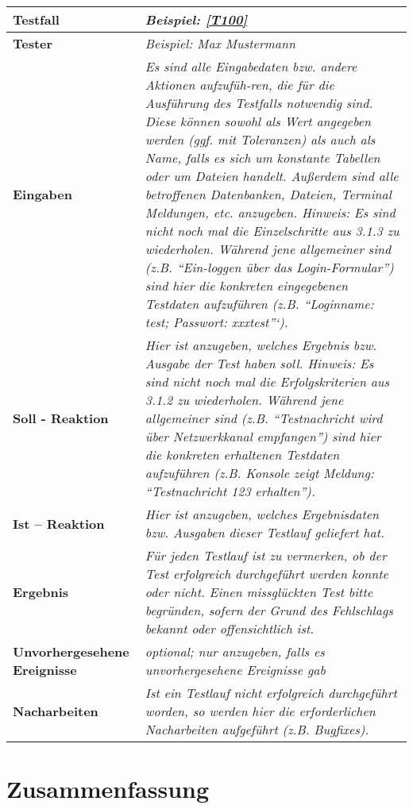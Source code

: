 \begin{longtable}{|p{4cm}|p{11cm}|}
\hline
\textbf{Testfall} & \textit{Beispiel: \ref{T100}} \\
\hline
\textbf{Tester} & \textit{Beispiel: Max Mustermann} \\
\hline
\textbf{Eingaben} & \textit{Es sind alle Eingabedaten bzw. andere Aktionen
aufzufüh-ren, die für die Ausführung des Testfalls notwendig sind.
Diese können sowohl als Wert angegeben werden (ggf. mit Toleranzen) als auch
als Name, falls es sich um konstante Tabellen oder um Dateien handelt. Außerdem
sind alle betroffenen Datenbanken, Dateien, Terminal Meldungen, etc. anzugeben.
Hinweis: Es sind nicht noch mal die Einzelschritte aus 3.1.3 zu wiederholen.
Während jene allgemeiner sind (z.B. "`Ein-loggen über das Login-Formular"')
sind hier die konkreten eingegebenen Testdaten aufzuführen (z.B. "`Loginname:
test; Passwort: xxxtest"'`). } \\
\hline
\textbf{Soll - Reaktion} & \textit{Hier ist anzugeben, welches Ergebnis bzw.
Ausgabe der Test haben soll.
Hinweis: Es sind nicht noch mal die Erfolgskriterien aus 3.1.2 zu wiederholen.
Während jene allgemeiner sind (z.B. "`Testnachricht wird über Netzwerkkanal
empfangen"') sind hier die konkreten erhaltenen Testdaten aufzuführen (z.B.
Konsole zeigt Meldung: "`Testnachricht 123 erhalten"').
} \\
\hline
\textbf{Ist -- Reaktion} & \textit{Hier ist anzugeben, welches Ergebnisdaten
bzw. Ausgaben dieser Testlauf geliefert hat.} \\
\hline
\textbf{Ergebnis} & \textit{Für jeden Testlauf ist zu vermerken, ob der Test
erfolgreich durchgeführt werden konnte oder nicht. Einen missglückten Test
bitte begründen, sofern der Grund des Fehlschlags bekannt oder offensichtlich
ist.} \\
\hline
\textbf{Unvorhergesehene Ereignisse} &
\textit{optional; nur anzugeben, falls es unvorhergesehene Ereignisse gab} \\
\hline
\textbf{Nacharbeiten } & \textit{Ist ein Testlauf nicht erfolgreich
durchgeführt worden, so werden hier die erforderlichen Nacharbeiten aufgeführt
(z.B. Bugfixes).} \\
\hline
\end{longtable}

\section{Zusammenfassung}

